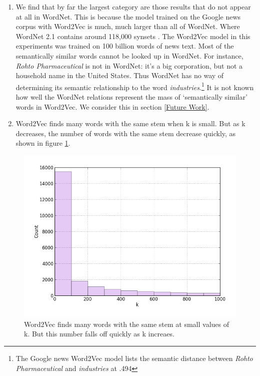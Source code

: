 \documentclass{article}
\begin{document}
\begin{enumerate}
  \item We find that by far the largest category are those results that do not appear at all in WordNet. This is because the model trained on the Google news corpus with Word2Vec is much, much larger than all of WordNet. Where WordNet 2.1 contains around 118,000 synsets \cite{wordnet}. The Word2Vec model in this experiments was trained on 100 billion words \cite{Word2VecWebsite} of news text. Most of the semantically similar words cannot be looked up in WordNet. For instance, \textit{Rohto Pharmaceutical} is not in WordNet: it's a big corporation, but not a household name in the United States. Thus WordNet has no way of determining its semantic relationship to the word \textit{industries}.\footnote{The Google news Word2Vec model lists the semantic distance between \textit{Rohto Pharmaceutical} and \textit{industries} at .494} It is not known how well the WordNet relations represent the mass of `semantically similar' words in Word2Vec. We consider this in section \ref{Future Work}.
\item Word2Vec finds many words with the same stem when k is small. But as k decreases, the number of words with the same stem decrease quickly, as shown in figure \ref{fig:same_stem}.
\end{enumerate}

\begin{figure}[!hb]
\centerline{\includegraphics[scale=.5]{Same_stem.png}}
  \caption{Word2Vec finds many words with the same stem at small values of k. But this number falls off quickly as k increaes.}
  \label{fig:same_stem}
\end{figure}
\end{document}
